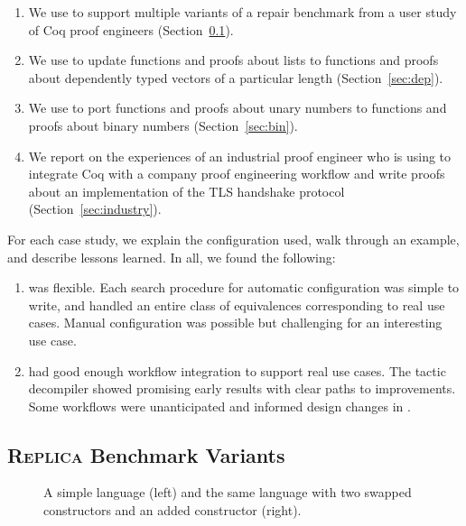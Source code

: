 \begin{enumerate}
\item We use \toolname to support multiple variants of a repair benchmark from a user study of Coq proof engineers (Section~\ref{sec:replica}).
\item We use \toolname to update functions and proofs about lists to functions and proofs about dependently typed vectors of
a particular length (Section~\ref{sec:dep}).
\item We use \toolname to port functions and proofs about unary numbers to functions and proofs about binary numbers (Section~\ref{sec:bin}).
\item We report on the experiences of an industrial proof engineer who is using \toolname to integrate Coq with a company proof engineering workflow and write proofs about an implementation of the TLS handshake protocol (Section~\ref{sec:industry}).
\end{enumerate}
For each case study, we explain the configuration used, walk through an example, and describe lessons learned.
In all, we found the following:

\begin{enumerate}
\item \toolname was flexible. Each search procedure for automatic configuration
was simple to write, and handled an entire class of equivalences corresponding to real use cases.
Manual configuration was possible but challenging for an interesting use case.
\item \toolname had good enough workflow integration to support real use cases.
The tactic decompiler showed promising early results with clear paths to improvements.
Some workflows were unanticipated and informed design changes in \toolname.
\end{enumerate}

\subsection{\textsc{Replica} Benchmark Variants}
\label{sec:replica}

\begin{figure*}
\begin{minipage}{0.48\textwidth}
   
\end{minipage}
\hfill
\begin{minipage}{0.48\textwidth}
   
\end{minipage}
\vspace{-0.4cm}
\caption{A simple language (left) and the same language with two swapped constructors and an added constructor (right).}
\label{fig:replica}
\end{figure*}

